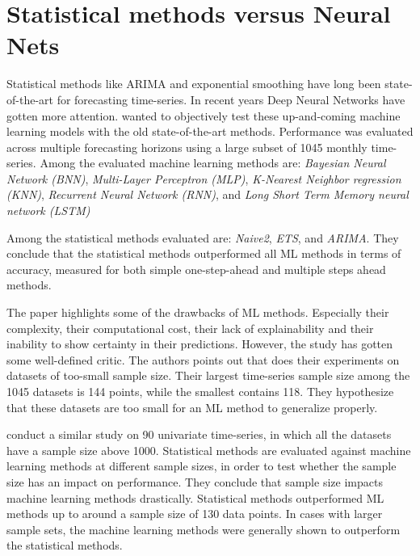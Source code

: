 \section{Statistical methods versus Neural Nets}
\label{section:RelatedWork:Statistical-NN}

Statistical methods like ARIMA and exponential smoothing have long been state-of-the-art for forecasting time-series.
In recent years Deep Neural Networks have gotten more attention.
\cite{Makridakis2018} wanted to objectively test these up-and-coming machine learning models with the old state-of-the-art methods.
Performance was evaluated across multiple forecasting horizons using a large subset of 1045 monthly time-series.
Among the evaluated machine learning methods are:
\textit{Bayesian Neural Network (BNN)},
\textit{Multi-Layer Perceptron (MLP)},
\textit{K-Nearest Neighbor regression (KNN)},
\textit{Recurrent Neural Network (RNN)}, and
\textit{Long Short Term Memory neural network (LSTM)}


Among the statistical methods evaluated are:
\textit{Naive2},
\textit{ETS}, and
\textit{ARIMA}.
They conclude that the statistical methods outperformed all ML methods in terms of accuracy, measured for both
simple one-step-ahead and multiple steps ahead methods.

The paper \cite{Makridakis2018} highlights some of the drawbacks of ML methods. Especially their complexity, their computational cost,
their lack of explainability and their inability to show certainty in their predictions.
However, the study has gotten some well-defined critic. The authors \citeauthor*{Cerqueira2019} points
out that \cite{Makridakis2018} does their experiments on datasets of too-small sample size.
Their largest time-series sample size among the 1045 datasets is 144 points, while the smallest contains 118.
They hypothesize that these datasets are too small for an ML method to generalize properly.

\cite{Cerqueira2019} conduct a similar study on 90 univariate time-series, in which
all the datasets have a sample size above 1000.
Statistical methods are evaluated against machine learning methods at different sample sizes,
in order to test whether the sample size has an impact on performance.
They conclude that sample size impacts machine learning methods drastically.
Statistical methods outperformed ML methods up to around a sample size of 130 data points.
In cases with larger sample sets, the machine learning methods were generally shown to outperform the statistical methods.

